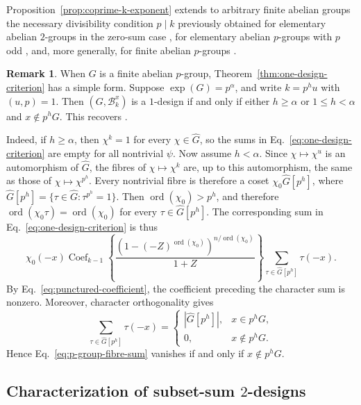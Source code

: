 \documentclass[11pt]{article}
\theoremstyle{definition}
\newtheorem{remark}[theorem]{Remark}
\DeclareMathOperator{\ord}{ord}
\newcommand{\cB}{\mathcal B}
\begin{document}
Proposition~\ref{prop:coprime-k-exponent} extends to arbitrary finite abelian groups the necessary divisibility condition $p\mid k$ previously obtained for elementary abelian $2$-groups in the zero-sum case \cite[Remark~2.7(1)]{FalconePavone2021}, for elementary abelian $p$-groups with $p$ odd \cite[Theorem~3.1]{Pavone2023}, and, more generally, for finite abelian $p$-groups \cite[Theorem~3.3 and Proposition~3.4]{LiuTangFanLuo2025}.


\begin{remark}\label{rem:p-group-one-design}
	When \(G\) is a finite abelian \(p\)-group, Theorem~\ref{thm:one-design-criterion} has a simple form. Suppose \(\exp(G)=p^\alpha\), and write \(k=p^h u\) with \((u,p)=1\). Then \((G,\cB_k^x)\) is a \(1\)-design if and only if either $h\ge\alpha$ or $1\le h<\alpha$ and $x\notin p^hG$. This recovers \cite[Theorem~3.3]{LiuTangFanLuo2025}.
	
	
	Indeed, if \(h\ge\alpha\), then \(\chi^k=1\) for every
	\(\chi\in\widehat G\), so the sums in Eq.~\eqref{eq:one-design-criterion}
	are empty for all nontrivial \(\psi\). Now assume \(h<\alpha\). Since \(\chi\mapsto\chi^u\) is an automorphism of \(\widehat G\), the fibres of \(\chi\mapsto\chi^k\) are, up to this automorphism, the same as those of \(\chi\mapsto\chi^{p^h}\). Every nontrivial fibre is therefore a coset \(\chi_0\widehat G[p^h]\), where
	\(\widehat G[p^h]=\{\tau\in\widehat G:\tau^{p^h}=1\}\). Then \(\ord(\chi_0)>p^h\), and therefore
	\(\ord(\chi_0\tau)=\ord(\chi_0)\) for every
	\(\tau\in\widehat G[p^h]\). The corresponding sum in
	Eq.~\eqref{eq:one-design-criterion} is thus
	\begin{equation}\label{eq:p-group-fibre-sum}
		\chi_0(-x)
		\operatorname{Coef}_{k-1}\left\{
		\frac{(1-(-Z)^{\ord(\chi_0)})^{n/\ord(\chi_0)}}{1+Z}\right\}
		\sum_{\tau\in\widehat G[p^h]}\tau(-x).
	\end{equation}
	By Eq.~\eqref{eq:punctured-coefficient}, the coefficient preceding the character sum is
	nonzero. Moreover, character orthogonality gives
	$$
	\sum_{\tau\in\widehat G[p^h]}\tau(-x)
	=
	\begin{cases}
		|\widehat G[p^h]|, & x\in p^hG,\\
		0, & x\notin p^hG.
	\end{cases}
	$$
	Hence Eq.~\eqref{eq:p-group-fibre-sum} vanishes if and only if \(x\notin p^hG\).
\end{remark}
 


\subsection{Characterization of subset-sum \texorpdfstring{$2$}{2}-designs}
\end{document}
